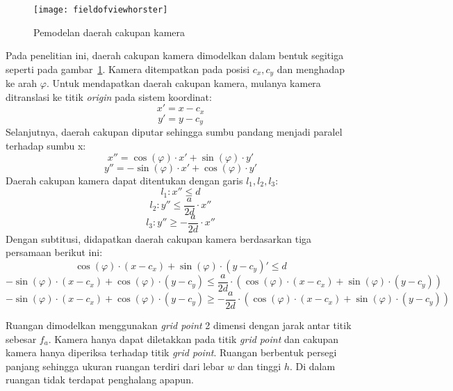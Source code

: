 \begin{figure}[H]
	\centering
	\texttt{[image: fieldofviewhorster]}
	\caption[Pemodelan daerah cakupan kamera]{Pemodelan daerah cakupan kamera}
	\label{fig:fieldofviewhorster}
\end{figure}
Pada penelitian ini, daerah cakupan kamera dimodelkan dalam bentuk segitiga seperti pada gambar~\ref{fig:fieldofviewhorster}. Kamera ditempatkan pada posisi \(c_x,c_y\) dan menghadap ke arah \(\varphi\). Untuk mendapatkan daerah cakupan kamera, mulanya kamera ditranslasi ke titik \textit{origin} pada sistem koordinat:
\begin{equation}
	x'=x-c_x
\end{equation}
\begin{equation}
	y'=y-c_y
\end{equation}
Selanjutnya, daerah cakupan diputar sehingga sumbu pandang menjadi paralel terhadap sumbu x:
\begin{equation}
	x''=\cos(\varphi)\cdot x'+\sin(\varphi)\cdot y'
\end{equation}
\begin{equation}
	y''=-\sin(\varphi)\cdot x'+\cos(\varphi)\cdot y'
\end{equation}
Daerah cakupan kamera dapat ditentukan dengan garis \(l_1,l_2,l_3\):
\begin{equation}
	l_1:x''\leq d
\end{equation}
\begin{equation}
	l_2:y''\leq \frac{a}{2d}\cdot x''
\end{equation}
\begin{equation}
	l_3:y''\geq-\frac{a}{2d}\cdot x''
\end{equation}
Dengan subtitusi, didapatkan daerah cakupan kamera berdasarkan tiga persamaan berikut ini:
\begin{equation}
	\cos(\varphi)\cdot(x-c_x)+\sin(\varphi)\cdot(y-c_y)'\leq d
	\label{eq:l1}
\end{equation}
\begin{equation}
	-\sin(\varphi)\cdot(x-c_x)+\cos(\varphi)\cdot(y-c_y)\leq \frac{a}{2d}\cdot (\cos(\varphi)\cdot(x-c_x)+\sin(\varphi)\cdot(y-c_y))	\label{eq:l2}
\end{equation}
\begin{equation}
	-\sin(\varphi)\cdot(x-c_x)+\cos(\varphi)\cdot(y-c_y)\geq- \frac{a}{2d}\cdot (\cos(\varphi)\cdot(x-c_x)+\sin(\varphi)\cdot(y-c_y))
	\label{eq:l3}
\end{equation}

Ruangan dimodelkan menggunakan \textit{grid point} 2 dimensi dengan jarak antar titik sebesar \(f_a\). Kamera hanya dapat diletakkan pada titik \textit{grid point} dan cakupan kamera hanya diperiksa terhadap titik \textit{grid point}. Ruangan berbentuk persegi panjang sehingga ukuran ruangan terdiri dari lebar \(w\) dan tinggi \(h\). Di dalam ruangan tidak terdapat penghalang apapun.

